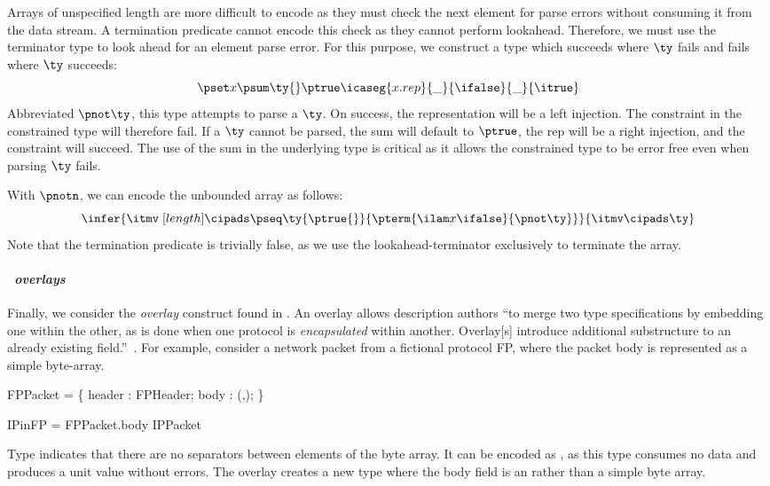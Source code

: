Arrays of unspecified length are more difficult to encode as they must
check the next element for parse errors without consuming it from the
data stream. A termination predicate cannot encode this check as they
cannot perform lookahead. Therefore, we must use the terminator type
to look ahead for an element parse error. For this purpose, we
construct a type which succeeds where $\ty$ fails and fails where
$\ty$ succeeds:
\[
\pset x {\psum \ty {} \ptrue} {\icaseg {x.rep} {\_}
  {\ifalse} {\_} {\itrue}}
\]
\noindent
Abbreviated $\pnot \ty$, this type attempts to parse a $\ty$. On
success, the representation will be a left injection. The constraint
in the constrained type will therefore fail. If a $\ty$ cannot be
parsed, the sum will default to $\ptrue$, the rep will be a right
injection, and the constraint will succeed. The use of the sum in the
underlying type is critical as it allows the constrained type to be
error free even when parsing $\ty$ fails.

With $\pnotn$, we can encode the unbounded \datascript{} array as
follows:
\[
  \infer{
    \itmv \; [{length}] \cipads 
    \pseq \ty {\ptrue{}} {\pterm {\ilam x {} \ifalse} {\pnot \ty}}
  }{ 
    \itmv \cipads \ty
  }
\]
Note that the termination predicate is trivially false, as we use the
lookahead-terminator exclusively to terminate the array. 

\paragraph*{\em \packettypes\ overlays}
Finally, we consider the {\it overlay} construct found in
\packettypes{}.  An overlay allows description authors ``to merge two
type specifications by embedding one within the other, as is done when
one protocol is {\it encapsulated} within another. Overlay[s]
introduce additional substructure to an already existing
field.''~\cite{sigcomm00}.  For example, consider a network packet
from a fictional protocol FP, where the packet body is represented as
a simple byte-array.
\begin{code}
FPPacket = \Pstruct \{
  header : FPHeader;
  body   : \Pbyte \Parray{}(\Pnosep,\Peof);
\}

IPinFP = \Poverlay FPPacket.body \Pwith IPPacket
\end{code}
Type \Pnosep{} indicates that there are no separators between elements
of the byte array. It can be encoded as , as
this type consumes no data and produces a unit value without errors.
The overlay creates a new type  where the body field is an
 rather than a simple byte array.

